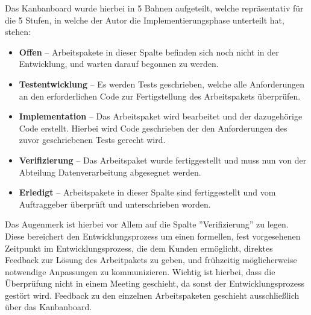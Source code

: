 Das Kanbanboard wurde hierbei in 5 Bahnen aufgeteilt, welche repräsentativ für
die 5 Stufen, in welche der Autor die Implementierungsphase unterteilt hat, stehen:
\begin{itemize}
    \item \textbf{Offen} -- Arbeitspakete in dieser Spalte befinden sich noch
    nicht in der Entwicklung, und warten darauf begonnen zu werden.
    \item \textbf{Testentwicklung} -- Es werden Tests geschrieben, welche alle
    Anforderungen an den erforderlichen Code zur Fertigstellung des Arbeitspakets
    überprüfen.
    \item \textbf{Implementation} -- Das Arbeitspaket wird bearbeitet und der dazugehörige Code erstellt. Hierbei wird Code geschrieben der den Anforderungen
    des zuvor geschriebenen Tests gerecht wird.
    \item \textbf{Verifizierung} -- Das Arbeitspaket wurde fertiggestellt und
    muss nun von der Abteilung Datenverarbeitung abgesegnet werden.
    \item \textbf{Erledigt} -- Arbeitspakete in dieser Spalte sind fertiggestellt
    und vom Auftraggeber überprüft und unterschrieben worden.
\end{itemize}

Das Augenmerk ist hierbei vor Allem auf die Spalte ''Verifizierung'' zu legen.
Diese bereichert den Entwicklungsprozess um einen formellen, fest vorgesehenen
Zeitpunkt im Entwicklungsprozess, die dem Kunden ermöglicht, direktes Feedback
zur Lösung des Arbeitpakets zu geben, und frühzeitig möglicherweise notwendige
Anpassungen zu kommunizieren. Wichtig ist hierbei, dass die Überprüfung nicht in
einem Meeting geschieht, da sonst der Entwicklungsprozess gestört wird. Feedback
zu den einzelnen Arbeitspaketen geschieht ausschließlich über das Kanbanboard.\par

